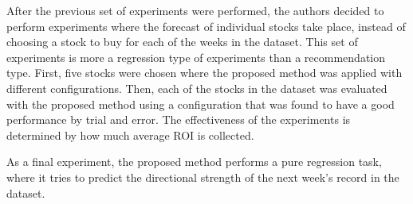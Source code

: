 \documentclass[a4paper,twoside]{article}
\begin{document}
After the previous set of experiments were performed, the authors
decided to perform experiments where the forecast of individual stocks
take place, instead of choosing a stock to buy for each of the weeks
in the dataset. This set of experiments is more a regression type of
experiments than a recommendation type. First, five stocks were chosen
where the proposed method was applied with different
configurations. Then, each of the stocks in the dataset was evaluated
with the proposed method using a configuration that was found to have
a good performance by trial and error. The effectiveness of the
experiments is determined by how much average ROI is collected. 

As a final experiment, the proposed method performs a pure regression
task, where it tries to predict the directional strength of the next
week's record in the dataset. 


\end{document}
